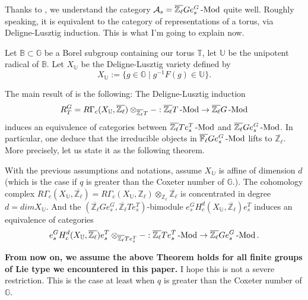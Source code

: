 	Thanks to \cite{broue1990isometries}, we understand the category $\mathcal{A}_s=\overline{\mathbb{Z}_\ell}Ge_s^G\operatorname{-Mod}$ quite well. Roughly speaking, it is equivalent to the category of representations of a torus, via Deligne-Lusztig induction. This is what I'm going to explain now.
	
	Let $\mathbb{B} \subset \mathbb{G}$ be a Borel subgroup containing our torus $\mathbb{T}$, let $\mathbb{U}$ be the unipotent radical of $\mathbb{B}$. Let $X_{\mathbb{U}}$ be the Deligne-Lusztig variety defined by
	$$X_{\mathbb{U}}:=\{g \in \mathbb{G} \;|\; g^{-1}F(g) \in \mathbb{U}\}.$$
	
	The main result of \cite{broue1990isometries} is the following: The Deligne-Lusztig induction 
	$$R_T^G=R\Gamma_c(X_{\mathbb{U}}, \overline{\mathbb{Z}_\ell})\otimes_{\overline{\mathbb{Z}_\ell}T}-: \overline{\mathbb{Z}_\ell}T\operatorname{-Mod} \to \overline{\mathbb{Z}_\ell}G\operatorname{-Mod}$$ induces an equivalence of categories between $\overline{\mathbb{Z}_\ell}Te_s^T\operatorname{-Mod}$ and $\overline{\mathbb{Z}_\ell}Ge_s^G\operatorname{-Mod}$. In particular, one deduce that the irreducible objects in $\overline{\mathbb{F}_\ell}Ge_s^G\operatorname{-Mod}$ lifts to $\overline{\mathbb{Z}_\ell}$. More precisely, let us state it as the following theorem.
	
	\begin{theorem}\label{Thm Broué}
		With the previous assumptions and notations, assume $X_{\mathbb{U}}$ is affine of dimension $d$ (which is the case if $q$ is greater than the Coxeter number of $\mathbb{G}$.). The cohomology complex $R\Gamma_c(X_{\mathbb{U}}, \overline{\mathbb{Z}_\ell})=R\Gamma_c(X_{\mathbb{U}}, {\mathbb{Z}_\ell}) \otimes_{\mathbb{Z}_\ell}$$\overline{\mathbb{Z}_\ell}$ is concentrated in degree $d=dimX_{\mathbb{U}}$. And the $(\overline{\mathbb{Z}_\ell}Ge_s^G, \overline{\mathbb{Z}_\ell}Te_s^T)$-bimodule $e_s^GH_c^d(X_{\mathbb{U}}, \overline{\mathbb{Z}_\ell})e_s^T$ induces an equivalence of categories
		$$e_s^GH_c^d(X_{\mathbb{U}}, \overline{\mathbb{Z}_\ell})e_s^T \otimes_{\overline{\mathbb{Z}_\ell}Te_s^T}-: \overline{\mathbb{Z}_\ell}Te_s^T\operatorname{-Mod} \to \overline{\mathbb{Z}_\ell}Ge_s^G\operatorname{-Mod}.$$
	\end{theorem}
	
	\textbf{From now on, we assume the above Theorem holds for all finite groups of Lie type we encountered in this paper.} I hope this is not a severe restriction. This is the case at least when $q$ is greater than the Coxeter number of $\mathbb{G}$.
	
